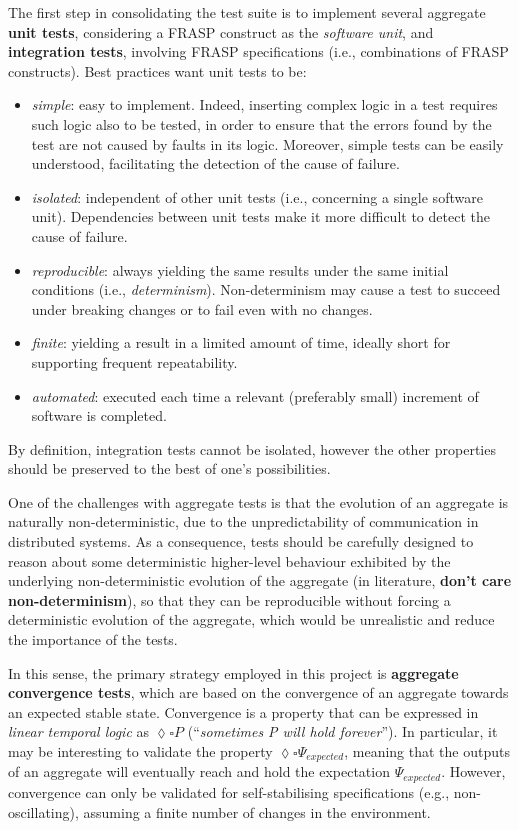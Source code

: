 The first step in consolidating the test suite is to implement several
aggregate \textbf{unit tests}, considering a FRASP construct as the
\textit{software unit}, and \textbf{integration tests}, involving FRASP
specifications (i.e., combinations of FRASP constructs). Best practices
\cite{UnitTesting} want unit tests to be:
\begin{itemize}
  \item \textit{simple}: easy to implement. Indeed, inserting complex logic in
        a test requires such logic also to be tested, in order to ensure that
        the errors found by the test are not caused by faults in its logic.
        Moreover, simple tests can be easily understood, facilitating the
        detection of the cause of failure.
  \item \textit{isolated}: independent of other unit tests (i.e., concerning
        a single software unit). Dependencies between unit tests make it more
        difficult to detect the cause of failure.
  \item \textit{reproducible}: always yielding the same results under the same
        initial conditions (i.e., \textit{determinism}). Non-determinism may
        cause a test to succeed under breaking changes or to fail even with
        no changes.
  \item \textit{finite}: yielding a result in a limited amount of time, ideally
        short for supporting frequent repeatability.
  \item \textit{automated}: executed each time a relevant (preferably small)
        increment of software is completed.
\end{itemize}

By definition, integration tests cannot be isolated, however the other
properties should be preserved to the best of one's possibilities.

One of the challenges with aggregate tests is that the evolution of an
aggregate is naturally non-deterministic, due to the unpredictability of
communication in distributed systems. As a consequence, tests should be
carefully designed to reason about some deterministic higher-level behaviour
exhibited by the underlying non-deterministic evolution of the aggregate (in
literature, \textbf{don't care non-determinism}), so that they can be
reproducible without forcing a deterministic evolution of the aggregate, which
would be unrealistic and reduce the importance of the tests.

In this sense, the primary strategy employed in this project is
\textbf{aggregate convergence tests}, which are based on the convergence of an
aggregate towards an expected stable state. Convergence is a property that can
be expressed in \textit{linear temporal logic} as $\lozenge \square P$
(\enquote{\textit{sometimes P will hold forever}}). In particular, it may be
interesting to validate the property $\lozenge \square \Psi_{expected}$,
meaning that the outputs of an aggregate will eventually reach and hold the
expectation $\Psi_{expected}$. However, convergence can only be validated for
self-stabilising specifications (e.g., non-oscillating), assuming a finite
number of changes in the environment.

